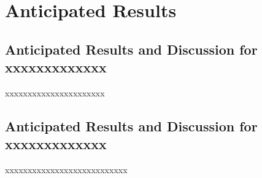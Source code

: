\chapter{Anticipated Results}

\section{Anticipated Results and Discussion for xxxxxxxxxxxxx}
xxxxxxxxxxxxxxxxxxxxxx

\section{Anticipated Results and Discussion for xxxxxxxxxxxxx}
xxxxxxxxxxxxxxxxxxxxxxxxxxx


